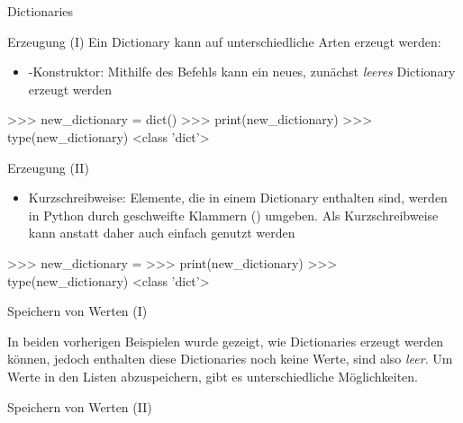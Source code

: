 \begin{subsection}{Dictionaries}
        \begin{frame}[fragile]{Erzeugung (I)}
            Ein Dictionary kann auf unterschiedliche Arten erzeugt werden:
            
            \begin{itemize}
                \item {}-Konstruktor: Mithilfe des Befehls  kann ein neues, zunächst \textit{leeres} Dictionary erzeugt werden
            \end{itemize}

\begin{pyconcode}
>>> new_dictionary = dict()
>>> print(new_dictionary)
{}
>>> type(new_dictionary)
<class 'dict'>
\end{pyconcode}             
    
        \end{frame}
        
        \begin{frame}[fragile]{Erzeugung (II)}
            
            \begin{itemize}
                \item Kurzschreibweise: Elemente, die in einem Dictionary enthalten sind, werden in Python durch geschweifte Klammern (\code{\{ \}}) umgeben. Als Kurzschreibweise kann anstatt  daher auch einfach \code{\{\}} genutzt werden
            \end{itemize}

\begin{pyconcode}
>>> new_dictionary = {}
>>> print(new_dictionary)
{}
>>> type(new_dictionary)
<class 'dict'>
\end{pyconcode}             
    
        \end{frame}

        
        \begin{frame}[fragile]{Speichern von Werten (I)}
            
            In beiden vorherigen Beispielen wurde gezeigt, wie Dictionaries erzeugt werden können, jedoch enthalten diese Dictionaries noch keine Werte, sind also \textit{leer}. Um Werte in den Listen abzuspeichern, gibt es unterschiedliche Möglichkeiten.
    
        \end{frame}
    
        \begin{frame}[fragile]{Speichern von Werten (II)}
            

\end{frame}
\end{subsection}
